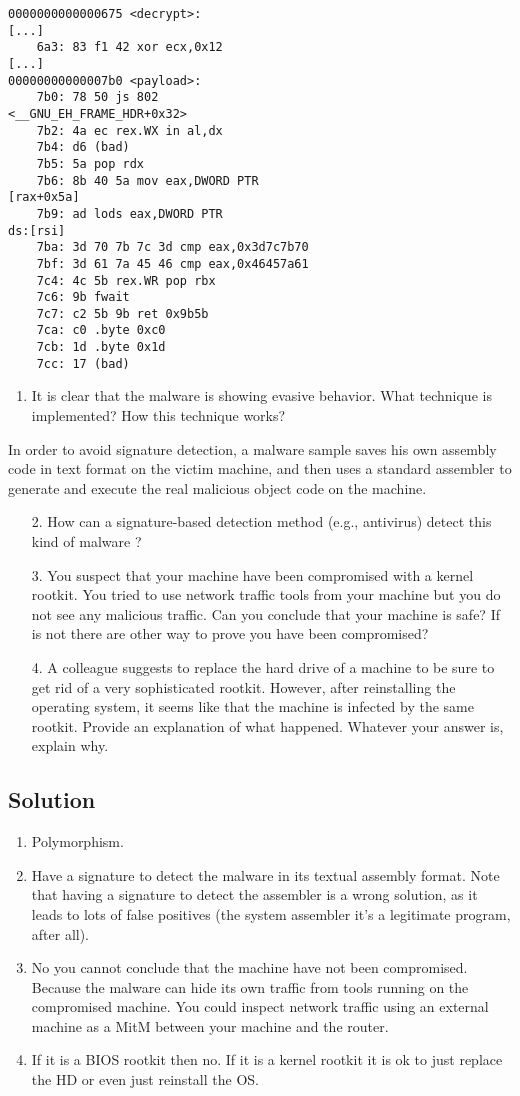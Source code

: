 \begin{verbatim}
0000000000000675 <decrypt>:
[...]
    6a3: 83 f1 42 xor ecx,0x12
[...]
00000000000007b0 <payload>:
    7b0: 78 50 js 802
<__GNU_EH_FRAME_HDR+0x32>
    7b2: 4a ec rex.WX in al,dx
    7b4: d6 (bad)
    7b5: 5a pop rdx
    7b6: 8b 40 5a mov eax,DWORD PTR
[rax+0x5a]
    7b9: ad lods eax,DWORD PTR
ds:[rsi]
    7ba: 3d 70 7b 7c 3d cmp eax,0x3d7c7b70
    7bf: 3d 61 7a 45 46 cmp eax,0x46457a61
    7c4: 4c 5b rex.WR pop rbx
    7c6: 9b fwait
    7c7: c2 5b 9b ret 0x9b5b
    7ca: c0 .byte 0xc0
    7cb: 1d .byte 0x1d
    7cc: 17 (bad) 
\end{verbatim}
\begin{enumerate}
    \item It is clear that the malware is showing evasive behavior. 
        What technique is implemented? How this technique works?
\end{enumerate}
In order to avoid signature detection, a malware sample saves his own assembly code in text format on the victim machine, and then uses a standard assembler to generate and execute the real malicious object code on the machine. 
\begin{enumerate}
    \item [2. ] How can a signature-based detection method (e.g., antivirus) detect this kind of malware ? 
    \item [3. ] You suspect that your machine have been compromised with a kernel rootkit. 
        You tried to use network traffic tools from your machine but you do not see any malicious traffic. 
        Can you conclude that your machine is safe? If is not there are other way to prove you have been compromised?
    \item [4. ] A colleague suggests to replace the hard drive of a machine to be sure to get rid of a very sophisticated rootkit.
        However, after reinstalling the operating system, it seems like that the machine is infected by the same rootkit. 
        Provide an explanation of what happened. 
        Whatever your answer is, explain why.
\end{enumerate}

\subsection*{Solution}
\begin{enumerate}
    \item Polymorphism. 
    \item Have a signature to detect the malware in its textual assembly format. 
        Note that having a signature to detect the assembler is a wrong solution, as it leads to lots of false positives (the system assembler it's a legitimate program, after all).
    \item No you cannot conclude that the machine have not been compromised. 
        Because the malware can hide its own traffic from tools running on the compromised machine. 
        You could inspect network traffic using an external machine as a MitM between your machine and the router.
    \item If it is a BIOS rootkit then no. 
        If it is a kernel rootkit it is ok to just replace the HD or even just reinstall the OS.
\end{enumerate}
